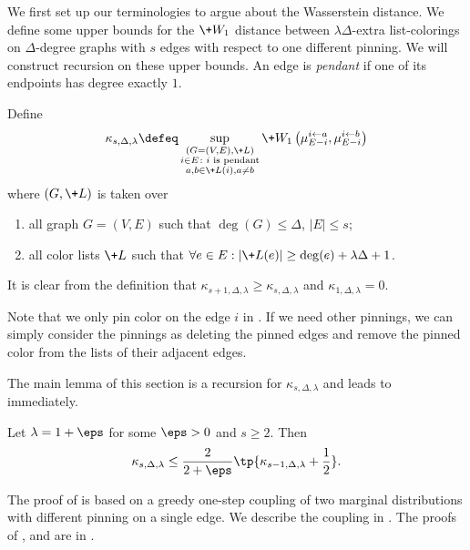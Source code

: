 \documentclass[a4paper,11pt]{article}
\newcommand{\pin}{\leftarrow}
\newcommand{\W}[1]{\+W_1\left(#1\right)}
\begin{document}
We first set up our terminologies to argue about the Wasserstein distance. We define some upper bounds for the $\+W_1$ distance between $\lambda\Delta$-extra list-colorings on $\Delta$-degree graphs with $s$ edges with respect to one different pinning. We will construct recursion on these upper bounds.
An edge is \emph{pendant} if one of its endpoints has degree exactly $1$.
\begin{definition}\label{def:kappa}
Define
\[
\kappa_{s, \Delta, \lambda} \defeq 
\sup_{\substack{(G=(V, E), \+L)\\ i\in E\colon i \text{ is pendant} \\ a, b\in \+L(i), a\neq b}}
\W{
\mu_{E-i}^{i\pin a}, \mu_{E-i}^{i\pin b}
}
\]
where $(G, \+L)$ is taken over
\begin{enumerate}
    \item all graph $G=(V, E)$ such that $\deg(G)\le \Delta$, $|E|\le s$;
    \item all color lists $\+L$ such that $\forall e\in E: |\+L(e)|\ge \deg(e) + \lambda \Delta + 1$.
\end{enumerate}
\end{definition}
\begin{remark}
    It is clear from the definition that $\kappa_{s+1, \Delta, \lambda}\ge \kappa_{s, \Delta, \lambda}$
    and $\kappa_{1, \Delta, \lambda}=0$.
\end{remark}

Note that we only pin color on the edge $i$ in . If we need other pinnings, we can simply consider the pinnings as deleting the pinned edges and remove the pinned color from the lists of their adjacent edges.


The main lemma of this section is a recursion for $\kappa_{s, \Delta, \lambda}$
and leads to  immediately.

\begin{lemma}\label{lem:kappa-recursion}
    Let $\lambda=1+\eps$ for some $\eps>0$ and $s\ge 2$. Then
    \[
    \kappa_{s, \Delta, \lambda} \le \frac{2}{2+\eps}\tp{\kappa_{s-1, \Delta, \lambda} + \frac12}.
    \]
\end{lemma}

The proof of  is based on a greedy one-step coupling of two marginal distributions with different pinning on a single edge. We describe the coupling in . The proofs of ,  and  are in .
\end{document}
